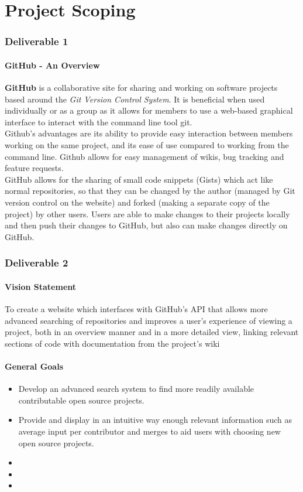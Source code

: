 \documentclass[12pt]{article}
\begin{document}
\part{Project Scoping}
\setcounter{section}{1}
\setcounter{subsection}{0}
\section*{Deliverable 1}
\subsection{GitHub - An Overview}
\textbf{GitHub} is a collaborative site for sharing and working on software projects based around the \textit{Git Version Control System}. It is beneficial when used individually or as a group as it allows for members to use a web-based graphical interface to interact with the command line tool git.\\ 

\noindent Github's advantages are its ability to provide easy interaction between members working on the same project, and its ease of use compared to working from the command line. Github allows for easy management of wikis, bug tracking and feature requests.\\

\noindent GitHub allows for the sharing of small code snippets (Gists) which act like normal repositories, so that they can be changed by the author (managed by Git version control on the website) and forked (making a separate copy of the project) by other users. Users are able to make changes to their projects locally and then push their changes to GitHub, but also can make changes directly on GitHub.

\vfill
\setcounter{section}{2}
\setcounter{subsection}{0}
\section*{Deliverable 2}
\subsection{Vision Statement}
To create a website which interfaces with GitHub's API that allows more advanced searching of repositories and improves a user's experience of viewing a project, both in an overview manner and in a more detailed view, linking relevant sections of code with documentation from the project's wiki
\subsection{General Goals}
\begin{itemize}
\item Develop an advanced search system to find more readily available contributable open source projects.
\item Provide and display in an intuitive way enough relevant information such as average input per contributor and merges to aid users with choosing new open source projects.
\item 
\item
\item
\end{itemize}
\end{document}

